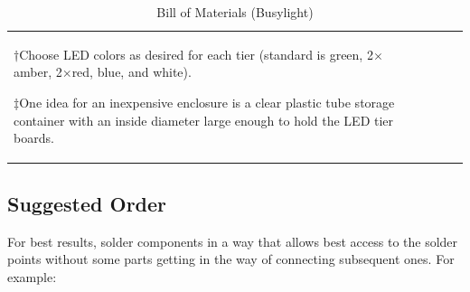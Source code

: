 \begin{table}
\begin{center}
\begin{tabular}{lrll}
{		\noindent$\dagger$Choose LED colors as desired for each tier (standard is green, 2$\times$amber, 2$\times$red,
		blue, and white).

		\noindent$\ddagger$One idea for an inexpensive enclosure is a clear plastic tube storage container with an inside
		diameter large enough to hold the LED tier boards.}
	\end{tabular}
	    \caption{Bill of Materials (Busylight)\label{fig:busylightbom}}
    \end{center}
\end{table}

\subsection{Suggested Order}
For best results, solder components in a way that allows best access to the
solder points without some parts getting in the way of connecting subsequent ones. For example:
